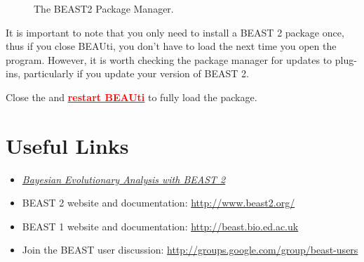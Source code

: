 \documentclass[11pt]{article}
\begin{document}
\begin{figure}[h!]
\centering
{}
\caption{\small The BEAST2 Package Manager.}
\label{packageManage}
\end{figure}

It is important to note that you only need to install a BEAST 2 package once, thus if you close BEAUti, you don't have to load  the next time you open the program. 
However, it is worth checking the package manager for updates to plug-ins, particularly if you update your version of BEAST 2.
\begin{framed}
Close the  and {\textcolor{red}{\underline{\bf restart BEAUti}}} to fully load the  package.
\end{framed}




\bigskip
\section{Useful Links}

\begin{itemize}
\item \href{http://www.beast2.org/book.html}{\textit{Bayesian Evolutionary Analysis with BEAST 2}}  \citep{BEAST2book2014}\\ \vspace{-7mm}
\item BEAST 2 website and documentation: \href{http://www.beast2.org/}{http://www.beast2.org/} \\ \vspace{-7mm}
\item BEAST 1 website and documentation: \href{http://beast.bio.ed.ac.uk}{http://beast.bio.ed.ac.uk} \\ \vspace{-7mm}
\item Join the BEAST user discussion: \href{http://groups.google.com/group/beast-users}{http://groups.google.com/group/beast-users} \\ \vspace{-7mm}
\end{itemize}
\end{document}
